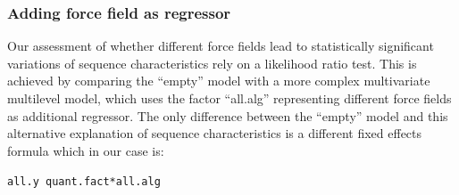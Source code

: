 \documentclass{article}\usepackage[table]{xcolor}
\makeatletter
\newcommand{\hlopt}[1]{\textcolor[rgb]{0,0,0}{#1}}%
\newcommand{\hlstd}[1]{\textcolor[rgb]{0.345,0.345,0.345}{#1}}%
\newenvironment{kframe}{%
 \def\at@end@of@kframe{}%
 \ifinner\ifhmode%
  \def\at@end@of@kframe{\end{minipage}}%
  \begin{minipage}{\columnwidth}%
 \fi\fi%
 \def\FrameCommand##1{\hskip\@totalleftmargin \hskip-\fboxsep
 \colorbox{shadecolor}{##1}\hskip-\fboxsep
     \hskip-\linewidth \hskip-\@totalleftmargin \hskip\columnwidth}%
 \MakeFramed {\advance\hsize-\width
   \@totalleftmargin\z@ \linewidth\hsize
   \@setminipage}}%
 {\par\unskip\endMakeFramed%
 \at@end@of@kframe}
\newenvironment{knitrout}{}{} %
\renewcommand{\$}{$} %
\makeatother
\begin{document}
\subsubsection{Adding force field as regressor}
Our assessment of whether different force fields lead to statistically
significant variations of sequence characteristics rely on a
likelihood ratio test. This is achieved by comparing the ``empty''
model with a more complex multivariate multilevel model, which uses
the factor ``all.alg'' representing different force fields as
additional regressor. The only difference between the ``empty'' model
and this alternative explanation of sequence characteristics is a
different fixed effects formula which in our case is:
\begin{knitrout}
\color{fgcolor}\begin{kframe}
\begin{alltt}
\hlstd{all.y}\hlopt{~}\hlstd{quant.fact}\hlopt{*}\hlstd{all.alg}
\end{alltt}
\end{kframe}
\end{knitrout}
\end{document}
